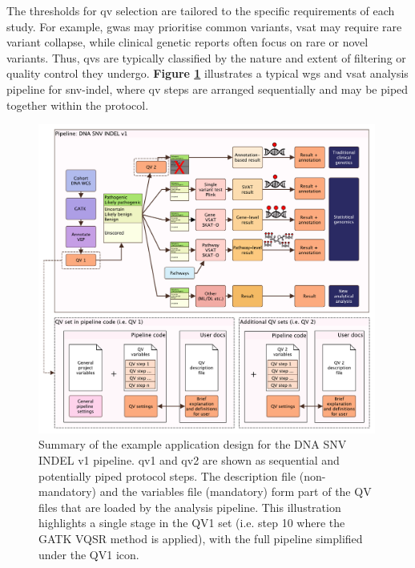 
The thresholds for \ac{qv} selection are tailored to the specific requirements of each study. For example, \ac{gwas} may prioritise common variants, \ac{vsat} may require rare variant collapse, while clinical genetic reports often focus on rare or novel variants. Thus, \ac{qv}s are typically classified by the nature and extent of filtering or quality control they undergo. \textbf{Figure \ref{fig:qv_pipeline_with_file_vcurrent}} illustrates a typical \ac{wgs} and \ac{vsat} analysis pipeline for \ac{snv}-\ac{indel}, where \ac{qv} steps are arranged sequentially and may be piped together within the protocol.

\begin{figure}[!h]
    \centering
   \includegraphics[width=0.99\textwidth]{./images/qv_pipeline_with_file_vcurrent.pdf}
    \caption{Summary of the example application design for the DNA SNV INDEL v1 pipeline. \ac{qv}1 and \ac{qv}2 are shown as sequential and potentially piped protocol steps. The description file (non-mandatory) and the variables file (mandatory) form part of the QV files that are loaded by the analysis pipeline. This illustration highlights a single stage in the QV1 set (i.e. step 10 where the GATK VQSR method is applied), with the full pipeline simplified under the QV1 icon.}
    \label{fig:qv_pipeline_with_file_vcurrent}
\end{figure}


